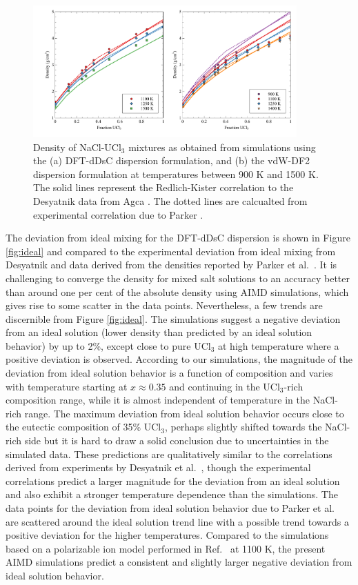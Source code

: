 \documentclass[preprint,3p,10pt,onecolumn,number,sort&compress]{elsarticle}
\begin{document}
\begin{figure}[htb]
\centering
\includegraphics[width=0.9\textwidth]{fig6.pdf}
\caption{Density of NaCl-UCl$_3$ mixtures as obtained from simulations using the (a) DFT-dDsC dispersion formulation, and (b) the vdW-DF2 dispersion formulation at temperatures between 900 K and 1500 K. The solid lines represent the Redlich-Kister correlation to the Desyatnik \cite{Desyatnik} data from Agca \cite{agca2022}. The dotted lines are calcualted from experimental correlation due to Parker \cite{Parker}.} 
\label{fig:NaClUCl3}
\end{figure}

The deviation from ideal mixing for the DFT-dDsC dispersion is shown in Figure \ref{fig:ideal} and compared to the experimental deviation from ideal mixing from Desyatnik \cite{Desyatnik} and data derived from the densities reported by Parker et al.~\cite{Parker}.  
It is challenging to converge the density for mixed salt solutions to an accuracy better than around one per cent of the absolute density using AIMD simulations, which gives rise to some scatter in the data points. Nevertheless, a few trends are discernible from Figure \ref{fig:ideal}. The simulations suggest a negative deviation from an ideal solution (lower density than predicted by an ideal solution behavior) by up to 2\%, except close to pure UCl$_3$ at high temperature where a positive deviation is observed. According to our simulations, the magnitude of the deviation from ideal solution behavior is a function of composition and varies with temperature starting at $x\approx0.35$ and continuing in the UCl$_3$-rich composition range, while it is almost independent of temperature in the NaCl-rich range. 
The maximum deviation from ideal solution behavior occurs close to the eutectic composition of 35\% UCl$_3$, perhaps slightly shifted towards the NaCl-rich side but it is hard to draw a solid conclusion due to uncertainties in the simulated data. These predictions are qualitatively similar to the correlations derived from experiments by Desyatnik et al.~\cite{Desyatnik}, though the experimental correlations predict a larger magnitude for the deviation from an ideal solution and also exhibit a stronger temperature dependence than the simulations. The data points for the deviation from ideal solution behavior due to Parker et al.~\cite{Parker} are scattered around the ideal solution trend line with a possible trend towards a positive deviation for the higher temperatures.
Compared to the simulations based on a polarizable ion model performed in Ref.~\cite{VANOUDENAREN2021117470} at 1100 K, the present AIMD simulations predict a consistent and slightly larger negative deviation from ideal solution behavior.
\end{document}
